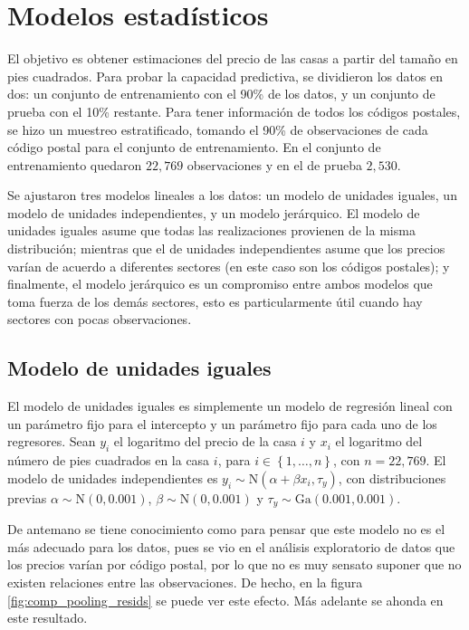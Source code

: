 
\section{Modelos estadísticos}
\label{sec:modelos}

El objetivo es obtener estimaciones del precio de las casas a partir del tamaño en pies cuadrados. Para probar la capacidad predictiva, se dividieron los datos en dos: un conjunto de entrenamiento con el 90\% de los datos, y un conjunto de prueba con el 10\% restante. Para tener información de todos los códigos postales, se hizo un muestreo estratificado, tomando el 90\% de observaciones de cada código postal para el conjunto de entrenamiento. En el conjunto de entrenamiento quedaron $22,769$ observaciones y en el de prueba $2,530$.	

Se ajustaron tres modelos lineales a los datos: un modelo de unidades iguales, un modelo de unidades independientes, y un modelo jerárquico. El modelo de unidades iguales asume que todas las realizaciones provienen de la misma distribución; mientras que el de unidades independientes asume que los precios varían de acuerdo a diferentes sectores (en este caso son los códigos postales); y finalmente, el modelo jerárquico es un compromiso entre ambos modelos que toma fuerza de los demás sectores, esto es particularmente útil cuando hay sectores con pocas observaciones.

\subsection{Modelo de unidades iguales}

El modelo de unidades iguales es simplemente un modelo de regresión lineal con un parámetro fijo para el intercepto y un parámetro fijo para cada uno de los regresores. Sean $y_i$ el logaritmo del precio de la casa $i$ y $x_i$ el logaritmo del número de pies cuadrados en la casa $i$, para $i \in \left\{1, \hdots, n \right\}$, con $n = 22,769$. El modelo de unidades independientes es $y_i \sim \mathrm{N}(\alpha + \beta x_i, \tau_y)$, con distribuciones previas $\alpha \sim \mathrm{N}(0, 0.001)$, $\beta \sim \mathrm{N}(0, 0.001)$ y $\tau_y \sim \mathrm{Ga}(0.001, 0.001)$. %

De antemano se tiene conocimiento como para pensar que este modelo no es el más adecuado para los datos, pues se vio en el análisis exploratorio de datos que los precios varían por código postal, por lo que no es muy sensato suponer que no existen relaciones entre las observaciones. De hecho, en la figura \ref{fig:comp_pooling_resids} se puede ver este efecto. Más adelante se ahonda en este resultado.


